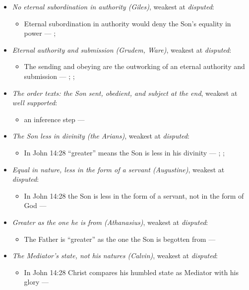 \documentclass[11pt,paper=\testimonypaper,DIV=13,parskip=false]{scrartcl}
\begin{document}
\begin{itemize}
\item \emph{No eternal subordination in authority (Giles)}, weakest at \emph{disputed}:
\begin{itemize}
\item Eternal subordination in authority would deny the Son’s equality in power --- \cite[323]{giles-ets-trinity-2008}; \cite{giles-jesus-and-the-father-2006}
\end{itemize}
\item \emph{Eternal authority and submission (Grudem, Ware)}, weakest at \emph{disputed}:
\begin{itemize}
\item The sending and obeying are the outworking of an eternal authority and submission --- \cite[40]{grudem-doctrinal-deviations-2015}; \cite{grudem-ets-trinity-2016}; \cite{ware-father-son-holy-spirit-2005}
\end{itemize}
\item \emph{The order texts: the Son sent, obedient, and subject at the end}, weakest at \emph{well supported}:
\begin{itemize}
\item an inference step --- \cite[3, The Triune God]{kibbey-living-systematic-theology-2026}
\end{itemize}
\item \emph{The Son less in divinity (the Arians)}, weakest at \emph{disputed}:
\begin{itemize}
\item In John 14:28 “greater” means the Son is less in his divinity --- \cite[De Synodis 28]{schaff-nicene-post-nicene-fathers-2-4-1892}; \cite[On the Trinity I.7.14]{schaff-nicene-post-nicene-fathers-1-3-1887}; \cite[102]{calvin-commentary-john-2-1847}
\end{itemize}
\item \emph{Equal in nature, less in the form of a servant (Augustine)}, weakest at \emph{disputed}:
\begin{itemize}
\item In John 14:28 the Son is less in the form of a servant, not in the form of God --- \cite[On the Trinity I.7.14]{schaff-nicene-post-nicene-fathers-1-3-1887}
\end{itemize}
\item \emph{Greater as the one he is from (Athanasius)}, weakest at \emph{disputed}:
\begin{itemize}
\item The Father is “greater” as the one the Son is begotten from --- \cite[Against the Arians I.13.58]{schaff-nicene-post-nicene-fathers-2-4-1892}
\end{itemize}
\item \emph{The Mediator’s state, not his natures (Calvin)}, weakest at \emph{disputed}:
\begin{itemize}
\item In John 14:28 Christ compares his humbled state as Mediator with his glory --- \cite[102--103]{calvin-commentary-john-2-1847}
\end{itemize}
\end{itemize}
\end{document}
